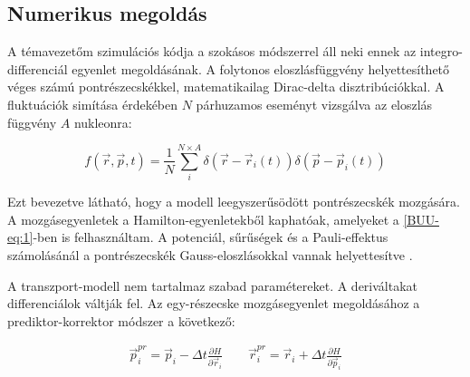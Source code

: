 \documentclass[a4paper,12pt]{article}
\begin{document}
\vspace{5mm}

\subsection{ Numerikus megoldás}

\vspace{5mm}

\par A témavezetőm szimulációs kódja \cite{wolf2, wolf3} a szokásos módszerrel áll neki ennek az integro-differenciál egyenlet megoldásának. A folytonos eloszlásfüggvény helyettesíthető véges számú pontrészecskékkel, matematikailag Dirac-delta disztribúciókkal. A fluktuációk simítása érdekében $N$ párhuzamos eseményt vizsgálva az eloszlás függvény $A$ nukleonra:

\vspace{5mm}

\begin{equation}
	f(\vec{r}, \vec{p}, t) = \frac{1}{N}\sum_{i}^{N \times A} \delta(\vec{r} - \vec{r}_{i}(t))\delta(\vec{p} - \vec{p}_{i}(t))
\end{equation}

\vspace{5mm}

\par Ezt bevezetve látható, hogy a modell leegyszerűsödött pontrészecskék mozgására. A mozgásegyenletek a Hamilton-egyenletekből kaphatóak, amelyeket a \eqref{BUU-eq:1}-ben is felhasználtam. A potenciál, sűrűségek és a Pauli-effektus számolásánál a pontrészecskék Gauss-eloszlásokkal vannak helyettesítve \cite{wolfDSC}.

\vspace{5mm}

\par A transzport-modell nem tartalmaz szabad paramétereket. A deriváltakat differenciálok váltják fel. Az egy-részecske mozgásegyenlet megoldásához a prediktor-korrektor módszer a következő:

\vspace{5mm}

\begin{gather}
	\vec{p}^{pr}_{i} = \vec{p}_{i} - \Delta t \frac{\partial H}{\partial \vec{r}_{i}} \quad \quad \vec{r}^{pr}_{i} = \vec{r}_{i} + \Delta t \frac{\partial H}{\partial \vec{p}_{i}}
\end{gather}

\vspace{5mm}
\end{document}
